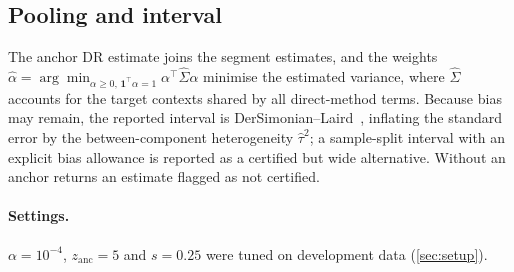 \subsection{Pooling and interval}
The anchor DR estimate joins the segment estimates, and the weights
$\hat\alpha=\arg\min_{\alpha\ge0,\,\mathbf1^\top\alpha=1}\alpha^\top\hat\Sigma\alpha$ minimise
the estimated variance, where $\hat\Sigma$ accounts for the target contexts shared by
all direct-method terms. Because bias may remain, the reported interval is
DerSimonian--Laird~\cite{dersimonian1986meta}, inflating the standard error by the
between-component heterogeneity $\hat\tau^2$; a sample-split interval with an explicit bias
allowance is reported as a certified but wide alternative.
Without an anchor \odrift{} returns an estimate flagged as not certified.


\paragraph{Settings.} $\alpha=10^{-4}$, $z_{\mathrm{anc}}=5$ and $s=0.25$ were tuned on development data (\cref{sec:setup}).
